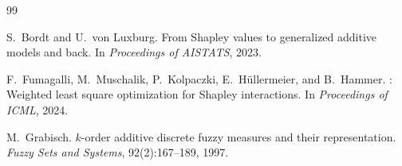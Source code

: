 \documentclass[11pt]{article}
\begin{document}



\begin{thebibliography}{99}

S.~Bordt and U.~von Luxburg.
\newblock From Shapley values to generalized additive models and back.
\newblock In \emph{Proceedings of AISTATS}, 2023.

F.~Fumagalli, M.~Muschalik, P.~Kolpaczki, E.~H{\"u}llermeier, and
  B.~Hammer.
: Weighted least square optimization for Shapley
  interactions.
\newblock In \emph{Proceedings of ICML}, 2024.

M.~Grabisch.
\newblock $k$-order additive discrete fuzzy measures and their representation.
\newblock \emph{Fuzzy Sets and Systems}, 92(2):167--189, 1997.

\end{thebibliography}
\end{document}

